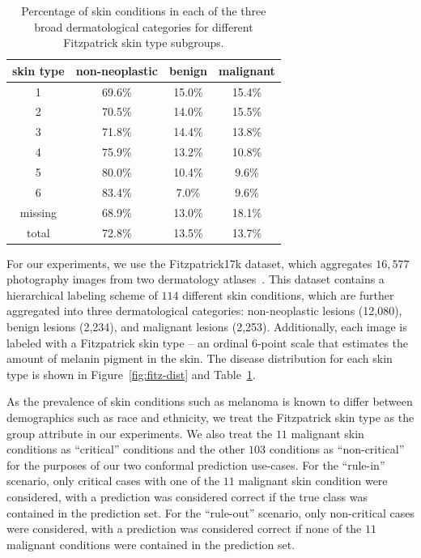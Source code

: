 \documentclass[letterpaper]{article} %
\begin{document}
        \begin{table}[t]
        \small
        \centering
        \begin{tabular}{cccc}
        \toprule
        \textbf{skin type} & \bf{non-neoplastic} & \bf{benign} & \bf{malignant} \\
        \midrule
        1 & 69.6\% & 15.0\% & 15.4\% \\
        2 & 70.5\% & 14.0\% & 15.5\% \\
        3 & 71.8\% & 14.4\% & 13.8\% \\
        4 & 75.9\% & 13.2\% & 10.8\% \\
        5 & 80.0\% & 10.4\% & 9.6\% \\
        6 & 83.4\% & 7.0\% & 9.6\% \\
        missing & 68.9\% & 13.0\% & 18.1\% \\
        \midrule
        total & 72.8\% & 13.5\% & 13.7\% \\
        \bottomrule
        \end{tabular}
        \caption{Percentage of skin conditions in each of the three broad dermatological categories for different Fitzpatrick skin type subgroups.}
        \label{tab:disease-prevalence}
        \end{table}

        For our experiments, we use the Fitzpatrick17k dataset, which aggregates $16,577$ photography images from two dermatology atlases~\cite{Groh2021EvaluatingDN}.
        This dataset contains a hierarchical labeling scheme of $114$ different skin conditions, which are further aggregated into three dermatological categories: non-neoplastic lesions (12,080), benign lesions (2,234), and malignant lesions (2,253).
        Additionally, each image is labeled with a Fitzpatrick skin type -- an ordinal 6-point scale that estimates the amount of melanin pigment in the skin.
        The disease distribution for each skin type is shown in Figure~\ref{fig:fitz-dist} and Table~\ref{tab:disease-prevalence}.

        As the prevalence of skin conditions such as melanoma is known to differ between demographics such as race and ethnicity, we treat the Fitzpatrick skin type as the group attribute in our experiments.
        We also treat the $11$ malignant skin conditions as ``critical'' conditions and the other $103$ conditions as ``non-critical'' for the purposes of our two conformal prediction use-cases.
        For the ``rule-in'' scenario, only critical cases with one of the $11$ malignant skin condition were considered, with a prediction was considered correct if the true class was contained in the prediction set.
        For the ``rule-out'' scenario, only non-critical cases were considered, with a prediction was considered correct if none of the $11$ malignant conditions were contained in the prediction set.
\end{document}
